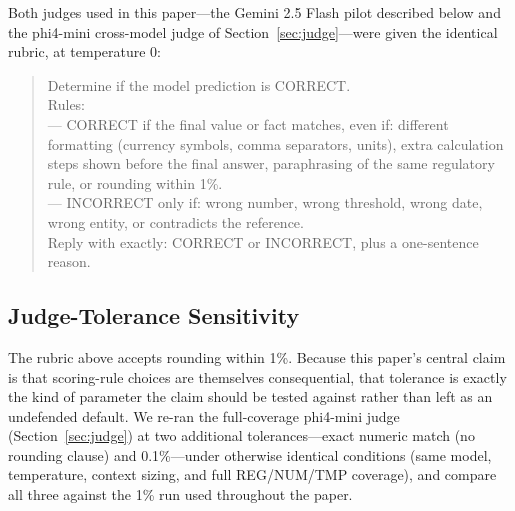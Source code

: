 Both judges used in this paper---the Gemini 2.5 Flash pilot described below and the phi4-mini cross-model judge of Section~\ref{sec:judge}---were given the identical rubric, at temperature 0:

\begin{quote}\small\noindent
Determine if the model prediction is CORRECT.\\
Rules:\\
--- CORRECT if the final value or fact matches, even if: different formatting (currency symbols, comma separators, units), extra calculation steps shown before the final answer, paraphrasing of the same regulatory rule, or rounding within 1\%.\\
--- INCORRECT only if: wrong number, wrong threshold, wrong date, wrong entity, or contradicts the reference.\\
Reply with exactly: CORRECT or INCORRECT, plus a one-sentence reason.
\end{quote}

\subsection{Judge-Tolerance Sensitivity}
\label{app:judge-tolerance}

The rubric above accepts rounding within 1\%. Because this paper's central claim is that
scoring-rule choices are themselves consequential, that tolerance is exactly the kind of parameter
the claim should be tested against rather than left as an undefended default. We re-ran the
full-coverage phi4-mini judge (Section~\ref{sec:judge}) at two additional tolerances---exact numeric
match (no rounding clause) and 0.1\%---under otherwise identical conditions (same model, temperature,
context sizing, and full REG/NUM/TMP coverage), and compare all three against the 1\% run used
throughout the paper.

\begin{table}[t]
\centering\small

\caption{Judge-only accuracy and rank at three rounding tolerances, all twelve models, sorted by the
1\% (paper) rank. Same phi4-mini judge and full REG/NUM/TMP coverage at every tolerance; only the
rubric's rounding clause differs.}
\label{tab:judgetolerance}
\end{table}

